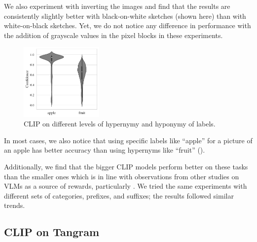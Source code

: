 We also experiment with inverting the images and find that the results are consistently slightly better with black-on-white sketches (shown here) than with white-on-black sketches.
Yet, we do not notice any difference in performance with the addition of grayscale values in the pixel blocks in these experiments.

\newpage
\begin{figure}
    \centering
    \includegraphics[width=0.36\textwidth]{images/hypercategory_comparison_2.pdf}
    \caption{CLIP on different levels of hypernymy and hyponymy of labels.}
    \label{fig:clip-hypercategory}
\end{figure}
In most cases, we also notice that using specific labels like ``apple'' for a picture of an apple has better accuracy than using hypernyms like ``fruit'' ().

Additionally, we find that the bigger CLIP models perform better on these tasks than the smaller ones which is in line with observations from other studies on VLMs as a source of rewards, particularly \cite{vlmrm}.
We tried the same experiments with different sets of categories, prefixes, and suffixes; the results followed similar trends.

\subsection{CLIP on Tangram}
\label{sec:clip-tangram}


